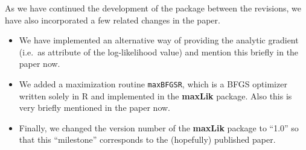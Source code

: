 \documentclass[12pt,parskip=half]{scrartcl}
\newcommand{\code}[1]{\texttt{#1}}
\newcommand{\pkg}[1]{\textbf{#1}}
\newcommand{\proglang}[1]{\textsf{#1}}
\begin{document}
As we have continued the development of the package between the
revisions, we have also incorporated a few related changes in the paper.
\begin{itemize}
\item We have implemented an alternative way of providing the analytic gradient
(i.e.\ as attribute of the log-likelihood value) and
mention this briefly in the paper now.
\item We added a maximization routine \code{maxBFGSR}, which is a BFGS optimizer
written solely in \proglang{R} and implemented in the \pkg{maxLik} package.
Also this is very briefly mentioned in the paper now.
\item 
Finally, we changed the version number of the \pkg{maxLik} package to ``1.0''
so that this ``milestone'' corresponds to the (hopefully) published paper.
\end{itemize}
\end{document}
